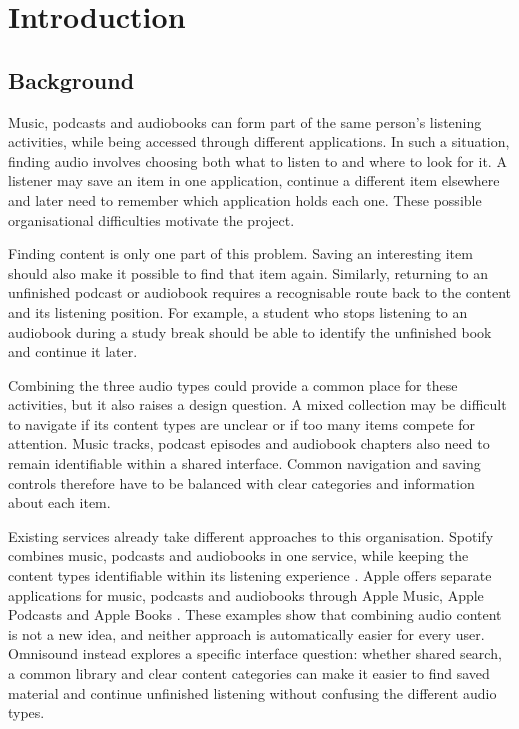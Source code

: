 \chapter{Introduction}
\label{chap:introduction}

\section{Background}
\label{sec:background}

Music, podcasts and audiobooks can form part of the same person's listening
activities, while being accessed through different applications. In such a
situation, finding audio involves choosing both what to listen to and where
to look for it. A listener may save an item in one application, continue a
different item elsewhere and later need to remember which application holds
each one. These possible organisational difficulties motivate the project.

Finding content is only one part of this problem. Saving an interesting item
should also make it possible to find that item again. Similarly, returning to
an unfinished podcast or audiobook requires a recognisable route back to the
content and its listening position. For example, a student who stops listening
to an audiobook during a study break should be able to identify the unfinished
book and continue it later.

Combining the three audio types could provide a common place for these
activities, but it also raises a design question. A mixed collection may be
difficult to navigate if its content types are unclear or if too many items
compete for attention. Music tracks, podcast episodes and audiobook chapters
also need to remain identifiable within a shared interface. Common navigation
and saving controls therefore have to be balanced with clear categories and
information about each item.

Existing services already take different approaches to this organisation. Spotify combines music, podcasts and audiobooks in one service, while keeping the content types identifiable within its listening experience \cite{spotifyaudiobooks2025}. Apple offers separate applications for music, podcasts and audiobooks through Apple Music, Apple Podcasts and Apple Books \cite{appleapps2026}. These examples show that combining audio content is not a new idea, and neither approach is automatically easier for every user. Omnisound instead explores a specific interface question: whether shared search, a common library and clear content categories can make it easier to find saved material and continue unfinished listening without confusing the different audio types.

